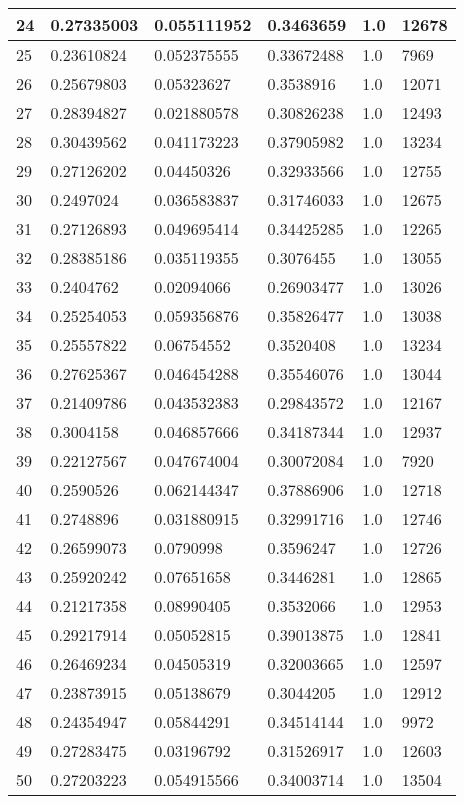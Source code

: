 \begin{longtable}{|l|l|l|l|l|l|}
24 & 0.27335003 & 0.055111952 & 0.3463659 & 1.0 & 12678 \\ \hline 
25 & 0.23610824 & 0.052375555 & 0.33672488 & 1.0 & 7969 \\ \hline 
26 & 0.25679803 & 0.05323627 & 0.3538916 & 1.0 & 12071 \\ \hline 
27 & 0.28394827 & 0.021880578 & 0.30826238 & 1.0 & 12493 \\ \hline 
28 & 0.30439562 & 0.041173223 & 0.37905982 & 1.0 & 13234 \\ \hline 
29 & 0.27126202 & 0.04450326 & 0.32933566 & 1.0 & 12755 \\ \hline 
30 & 0.2497024 & 0.036583837 & 0.31746033 & 1.0 & 12675 \\ \hline 
31 & 0.27126893 & 0.049695414 & 0.34425285 & 1.0 & 12265 \\ \hline 
32 & 0.28385186 & 0.035119355 & 0.3076455 & 1.0 & 13055 \\ \hline 
33 & 0.2404762 & 0.02094066 & 0.26903477 & 1.0 & 13026 \\ \hline 
34 & 0.25254053 & 0.059356876 & 0.35826477 & 1.0 & 13038 \\ \hline 
35 & 0.25557822 & 0.06754552 & 0.3520408 & 1.0 & 13234 \\ \hline 
36 & 0.27625367 & 0.046454288 & 0.35546076 & 1.0 & 13044 \\ \hline 
37 & 0.21409786 & 0.043532383 & 0.29843572 & 1.0 & 12167 \\ \hline 
38 & 0.3004158 & 0.046857666 & 0.34187344 & 1.0 & 12937 \\ \hline 
39 & 0.22127567 & 0.047674004 & 0.30072084 & 1.0 & 7920 \\ \hline 
40 & 0.2590526 & 0.062144347 & 0.37886906 & 1.0 & 12718 \\ \hline 
41 & 0.2748896 & 0.031880915 & 0.32991716 & 1.0 & 12746 \\ \hline 
42 & 0.26599073 & 0.0790998 & 0.3596247 & 1.0 & 12726 \\ \hline 
43 & 0.25920242 & 0.07651658 & 0.3446281 & 1.0 & 12865 \\ \hline 
44 & 0.21217358 & 0.08990405 & 0.3532066 & 1.0 & 12953 \\ \hline 
45 & 0.29217914 & 0.05052815 & 0.39013875 & 1.0 & 12841 \\ \hline 
46 & 0.26469234 & 0.04505319 & 0.32003665 & 1.0 & 12597 \\ \hline 
47 & 0.23873915 & 0.05138679 & 0.3044205 & 1.0 & 12912 \\ \hline 
48 & 0.24354947 & 0.05844291 & 0.34514144 & 1.0 & 9972 \\ \hline 
49 & 0.27283475 & 0.03196792 & 0.31526917 & 1.0 & 12603 \\ \hline 
50 & 0.27203223 & 0.054915566 & 0.34003714 & 1.0 & 13504 \\ \hline 
\end{longtable}